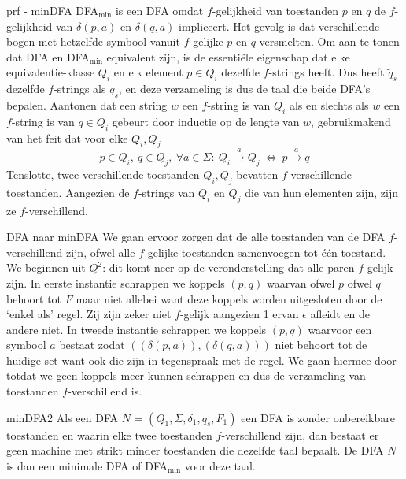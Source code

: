 \begin{prf}{prf - minDFA}
    DFA$_{\text{min}}$ is een DFA omdat $f$-gelijkheid van toestanden $p$ en $q$ de $f$-gelijkheid van \(\delta(p,a)\) en \(\delta(q,a)\) impliceert. Het gevolg is dat verschillende bogen met hetzelfde symbool
    vanuit $f$-gelijke $p$ en $q$ versmelten. Om aan te tonen dat DFA en DFA$_{\text{min}}$ equivalent zijn, is de essentiële eigenschap dat elke equivalentie-klasse $Q_i$ en elk element \(p \in Q_i\)
    dezelfde $f$-strings heeft. Dus heeft $\tilde{q}_s$ dezelfde $f$-strings als $q_s$, en deze verzameling is dus de taal die beide DFA's bepalen. Aantonen dat een string $w$ een $f$-string is van $Q_i$
    als en slechts als $w$ een $f$-string is van \(q \in Q_i\) gebeurt door inductie op de lengte van $w$, gebruikmakend van het feit dat voor elke \(Q_i,Q_j\)
    \begin{equation*}
        p \in Q_i, \ q \in Q_j, \ \forall a \in \Sigma: \ Q_i \overset{a}{\to} Q_j \ \Leftrightarrow \ p \overset{a}{\to} q 
    \end{equation*}
    Tenslotte, twee verschillende toestanden $Q_i, Q_j$ bevatten $f$-verschillende toestanden. Aangezien de $f$-strings van $Q_i$ en $Q_j$ die van hun elementen zijn, zijn ze $f$-verschillend.
\end{prf}

\newpage

\begin{alg}{DFA naar minDFA}
    We gaan ervoor zorgen dat de alle toestanden van de DFA $f$-verschillend zijn, ofwel alle $f$-gelijke toestanden samenvoegen tot één toestand. We beginnen uit $Q^2$: dit komt neer op de veronderstelling dat alle paren $f$-gelijk zijn. In eerste instantie schrappen we koppels $(p,q)$ waarvan ofwel $p$ ofwel $q$ behoort tot $F$ maar niet allebei want deze koppels worden uitgesloten door de `enkel als' regel. Zij zijn zeker niet $f$-gelijk aangezien 1 ervan $\epsilon$ afleidt en de andere niet. In tweede instantie schrappen we koppels $(p,q)$ waarvoor een symbool $a$ bestaat zodat $((\delta(p,a)),(\delta(q,a)))$ niet behoort tot de huidige set want ook die zijn in tegenspraak met de regel. We gaan hiermee door totdat we geen koppels meer kunnen schrappen en dus de verzameling van toestanden $f$-verschillend is. 
\end{alg}

\begin{lem}{minDFA2}
    Als een DFA $N$ = $(Q_1,\Sigma, \delta_1, q_s, F_1)$  een DFA is zonder onbereikbare toestanden en waarin elke twee toestanden $f$-verschillend zijn, dan bestaat er geen machine met strikt minder toestanden die dezelfde taal bepaalt. De DFA $N$ is dan een minimale DFA of DFA$_{\text{min}}$ voor deze taal.

\end{lem}

